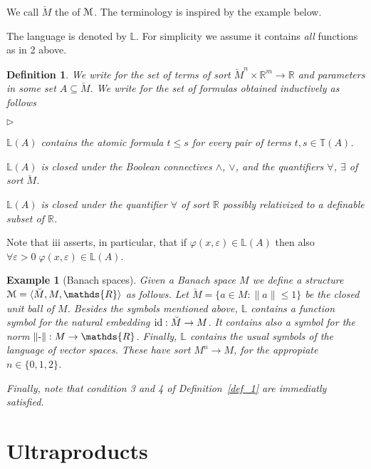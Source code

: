 \documentclass[12pt,letterpaper,oneside,reqno]{amsart}
\newcommand{\mylabel}[1]{{#1}\hfill}
\renewenvironment{itemize}
  {\begin{list}{$\triangleright$}{%
   \setlength{\parskip}{0mm}
   \setlength{\topsep}{.2\baselineskip}
   \setlength{\rightmargin}{0mm}
   \setlength{\listparindent}{0mm}
   \setlength{\itemindent}{0mm}
   \setlength{\labelwidth}{3ex}
   \setlength{\itemsep}{.2\baselineskip}
   \setlength{\parsep}{.2\baselineskip}
   \setlength{\partopsep}{0mm}
   \setlength{\labelsep}{1ex}
   \setlength{\leftmargin}{\labelwidth+\labelsep}
   \let\makelabel\mylabel}}{%
   \end{list}}
\theoremstyle{plain}
\newtheorem{definition}[theorem]{Definition}
\newtheorem{example}[theorem]{Example}
\theoremstyle{remark}
\renewcommand*{\emph}[1]{%
   \smash{\tikz[baseline]\node[rectangle, fill=olive!25, rounded corners, inner xsep=0.5ex, inner ysep=0.2ex, anchor=base, minimum height = 2.7ex]{#1};}}
\begin{document}
We call $\breve M$ the \emph{unit ball\/} of ${\EuScript M}$.
The terminology is inspired by the example below.

The language is denoted by $\mathds{L}$.
For simplicity we assume it contains \textit{all\/} functions as in 2 above.

\begin{definition}
  We write \emph{$\mathds{T}(A)$\/} for the set of terms of sort $\breve M^n\times\mathds{R}^m\to\mathds{R}$ and parameters in some set $A\subseteq \breve M$.
  We write \emph{$\mathds{L}(A)$\/} for the set of formulas obtained inductively as follows
  \begin{itemize}
  \item[i.] $\mathds{L}(A)$ contains the atomic formula $t\le s$ for every pair of terms $t,s\in\mathds{T}(A)$.
  \item[ii.] $\mathds{L}(A)$ is closed under the Boolean connectives $\wedge$, $\vee$, and the quantifiers $\forall$, $\exists$ of sort $\breve M$.
  \item[iii.] $\mathds{L}(A)$ is closed under the quantifier $\forall$ of sort $\mathds{R}$ possibly relativized to a definable subset of $\mathds{R}$.
  \end{itemize}
\end{definition}

Note that iii asserts, in particular, that if $\varphi(x,\varepsilon)\in\mathds{L}(A)$ then also $\forall\varepsilon{>}0\;\varphi(x,\varepsilon)\in\mathds{L}(A)$.

\begin{example}[Banach spaces]
  Given a Banach space  $M$ we define a structure ${\EuScript M}=\langle \breve M,M,\mathds{R}\rangle$ as follows.
  Let $\breve M=\{a\in M: \|a\|\le1\}$ be the closed unit ball of $M$.
  Besides the symbols mentioned above, $\mathds{L}$ contains a function symbol for the natural embedding ${\rm id}:\breve M\to M$.
  It contains also a symbol for the norm $\|\mbox-\|:M\to\mathds{R}$.
  Finally, $\mathds{L}$ contains the usual symbols of the language of vector spaces.
  These have sort ${M}^n\to M$, for the appropiate $n\in\{0,1,2\}$.

  Finally, note that condition 3 and 4 of Definition~\ref{def_1} are immediatly satisfied.
\end{example}


\section{Ultraproducts}\label{ultrapws}
\end{document}
